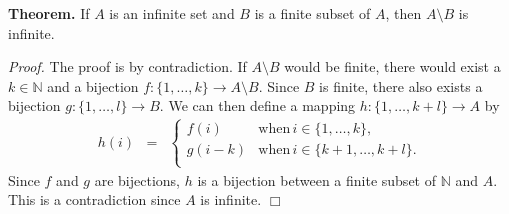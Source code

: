 \documentclass[12pt]{article}
\newcommand{\sN}[0]{\mathbb{N}}
\begin{document}
{\bf Theorem.} If $A$ is an infinite set and $B$ is a 
finite subset of $A$, then $A\setminus B$ is infinite. 

\emph{Proof.} The proof is by contradiction. If $A\setminus B$ 
would be finite, there would exist a $k\in \sN$ and a bijection 
$f:\{1,\ldots, k\}\to A\setminus B$. Since $B$ is finite, there
also exists a bijection $g:\{1,\ldots, l\}\to B$. We can then define 
a mapping $h:\{1,\ldots, k+l\} \to A$ by
\begin{eqnarray*}
h(i)&=& \left\{ \begin {array}{ll} 
  f(i) & \mbox{when} \, i\in \{1,\ldots, k\}, \\
  g(i-k) & \mbox{when}\, i\in\{k+1,\ldots, k+l\}. \\
  \end{array} \right.
\end{eqnarray*}
Since $f$ and $g$ are bijections, $h$ is a bijection between
a finite subset of $\sN$ and $A$. This is a contradiction
since $A$ is infinite. $\Box$
\end{document}
